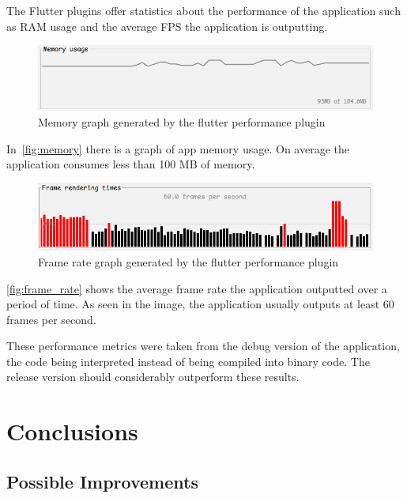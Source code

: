 \documentclass[a4paper,12pt]{report}
\begin{document}
The Flutter plugins offer statistics about the performance of the application
such as RAM usage and the average FPS the application is outputting.

\begin{figure}[H]
    \centering
    \includegraphics[scale=0.7]{images/app/memory.png}
    \caption{Memory graph generated by the flutter performance plugin}\label{fig:memory}
\end{figure}

In~\autoref{fig:memory} there is a graph of app memory usage. On average the
application consumes less than 100 MB of memory.

\begin{figure}[H]
    \centering
    \includegraphics[scale=0.7]{images/app/frame_rate.png}
    \caption{Frame rate graph generated by the flutter performance plugin}\label{fig:frame_rate}
\end{figure}

\autoref{fig:frame_rate} shows the average frame rate the application outputted over a period of time. As seen in the image, the application usually outputs at least 60 frames
per second.

These performance metrics were taken from the debug version of the application,
the code being interpreted instead of being compiled into binary code. The
release version should considerably outperform these results.

\chapter{Conclusions}

\section{Possible Improvements}



\end{document}
